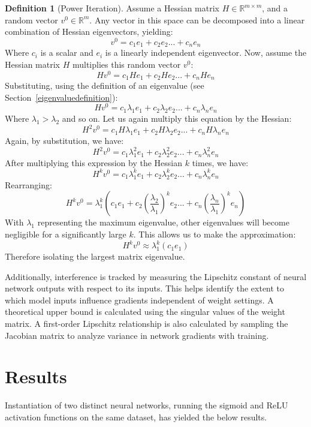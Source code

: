 \documentclass{article}
\theoremstyle{definition}
\newtheorem{definition}{Definition}[section]
\begin{document}
\begin{definition}[Power Iteration]
    Assume a Hessian matrix $H \in \mathbb{R}^{m \times m}$, and a random vector $v^0 \in \mathbb{R}^m$. Any vector in this space can be decomposed into a linear combination of Hessian eigenvectors, yielding:
    \[
        v^0 = c_1e_1 + c_2e_2 ... + c_ne_n
    \]
    Where $c_i$ is a scalar and $e_i$ is a linearly independent eigenvector. Now, assume the Hessian matrix $H$ multiplies this random vector $v^0$:
    \[
        Hv^0 = c_1He_1 + c_2He_2 ... + c_nHe_n
    \]
    Substituting, using the definition of an eigenvalue (see Section~\ref{eigenvaluedefinition}):
    \[
        Hv^0 = c_1\lambda_1e_1 + c_2\lambda_2e_2 ... + c_n\lambda_ne_n
    \]
    Where $\lambda_1 > \lambda_2$ and so on. Let us again multiply this equation by the Hessian:
    \[
        H^2v^0 = c_1H\lambda_1e_1 + c_2H\lambda_2e_2 ... + c_nH\lambda_ne_n
    \]
    Again, by substitution, we have:
    \[
        H^2v^0 = c_1\lambda_1^2e_1 + c_2\lambda_2^2e_2 ... + c_n\lambda_n^2e_n
    \]
    After multiplying this expression by the Hessian $k$ times, we have:
    \[
        H^kv^0 = c_1\lambda_1^ke_1 + c_2\lambda_2^ke_2 ... + c_n\lambda_n^ke_n
    \]
    Rearranging:
    \[
        H^kv^0 = \lambda_1^k (c_1e_1 + c_2{\left(\frac{\lambda_2}{\lambda_1}\right)}^ke_2 ... + c_n{\left(\frac{\lambda_n}{\lambda_1}\right)}^ke_n)
    \]
    With $\lambda_1$ representing the maximum eigenvalue, other eigenvalues will become negligible for a significantly large $k$. This allows us to make the approximation:
    \[
        H^kv^0 \approx \lambda_1^k (c_1e_1)
    \]
    Therefore isolating the largest matrix eigenvalue.

    Additionally, interference is tracked by measuring the Lipschitz constant of neural network outputs with respect to its inputs. This helps identify the extent to which model inputs influence gradients independent of weight settings. A theoretical upper bound is calculated using the singular values of the weight matrix. A first-order Lipschitz relationship is also calculated by sampling the Jacobian matrix to analyze variance in network gradients with training.
\end{definition}
\section{Results}
Instantiation of two distinct neural networks, running the sigmoid and ReLU activation functions on the same dataset, has yielded the below results.
\end{document}
